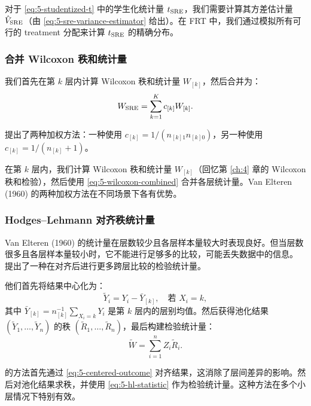 \begin{Example}[学生化分层统计量的应用]\label{ex:5-studentized}
对于 \cref{eq:5-studentized-t} 中的学生化统计量 $t_{\text{SRE}}$，我们需要计算其方差估计量 $\hat V_{\text{SRE}}$（由 \cref{eq:5-sre-variance-estimator} 给出）。在 FRT 中，我们通过模拟所有可行的 treatment 分配来计算 $t_{\text{SRE}}$ 的精确分布。
\end{Example}

\subsubsection{合并 Wilcoxon 秩和统计量}\label{sec:5-wilcoxon}

我们首先在第 $k$ 层内计算 Wilcoxon 秩和统计量 $W_{[k]}$，然后合并为：
\[
W_{\text{SRE}} = \sum_{k=1}^K c_{[k]} W_{[k]} .
\label{eq:5-wilcoxon-combined}
\]

\citet{VanElteren:1960} 提出了两种加权方法：一种使用 $c_{[k]} = 1 / (n_{[k]1} n_{[k]0})$，另一种使用 $c_{[k]} = 1 / (n_{[k]} + 1)$。

\begin{Example}\label{ex:5-wilcoxon}
在第 $k$ 层内，我们计算 Wilcoxon 秩和统计量 $W_{[k]}$（回忆第 \ref{ch:4} 章的 Wilcoxon 秩和检验），然后使用 \cref{eq:5-wilcoxon-combined} 合并各层统计量。Van Elteren (1960) 的两种加权方法在不同场景下各有优势。
\end{Example}

\subsubsection{Hodges--Lehmann 对齐秩统计量}\label{sec:5-hodges-lehmann}

Van Elteren (1960) 的统计量在层数较少且各层样本量较大时表现良好。但当层数很多且各层样本量较小时，它不能进行足够多的比较，可能丢失数据中的信息。\citet{HodgesLehmann:1962} 提出了一种在对齐后进行更多跨层比较的检验统计量。

他们首先将结果中心化为：
\[
\tilde Y_i = Y_i - \bar Y_{[k]}, \quad \text{若 } X_i = k ,
\label{eq:5-centered-outcome}
\]
其中 $\bar Y_{[k]} = n_{[k]}^{-1} \sum_{X_i = k} Y_i$ 是第 $k$ 层内的层别均值。然后获得池化结果 $(\tilde Y_1, \dots, \tilde Y_n)$ 的秩 $(\tilde R_1, \dots, \tilde R_n)$，最后构建检验统计量：
\[
\tilde W = \sum_{i=1}^n Z_i \tilde R_i .
\label{eq:5-hl-statistic}
\]

\begin{Example}\label{ex:5-hl-aligned}
\citet{HodgesLehmann:1962} 的方法首先通过 \cref{eq:5-centered-outcome} 对齐结果，这消除了层间差异的影响。然后对池化结果求秩，并使用 \cref{eq:5-hl-statistic} 作为检验统计量。这种方法在多个小层情况下特别有效。
\end{Example}

